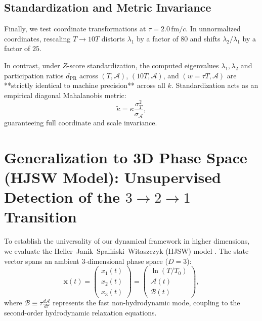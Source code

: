 \documentclass[11pt,a4paper]{article}
\begin{document}
\subsection{Standardization and Metric Invariance}
Finally, we test coordinate transformations at $\tau = 2.0\,\mathrm{fm}/c$. In unnormalized coordinates, rescaling $T \to 10T$ distorts $\lambda_1$ by a factor of $80$ and shifts $\lambda_2/\lambda_1$ by a factor of $25$.

In contrast, under $Z$-score standardization, the computed eigenvalues $\lambda_1, \lambda_2$ and participation ratios $d_{\mathrm{PR}}$ across $(T, \mathcal{A})$, $(10T, \mathcal{A})$, and $(w = \tau T, \mathcal{A})$ are **strictly identical to machine precision** across all $k$. Standardization acts as an empirical diagonal Mahalanobis metric:
\begin{equation}
    \tilde{\kappa} = \kappa \frac{\sigma_T^2}{\sigma_{\mathcal{A}}},
\end{equation}
guaranteeing full coordinate and scale invariance.

\section{Generalization to 3D Phase Space (HJSW Model): Unsupervised Detection of the \texorpdfstring{$3 \to 2 \to 1$}{3 -> 2 -> 1} Transition}
\label{sec:hjsw_generalization}
To establish the universality of our dynamical framework in higher dimensions, we evaluate the Heller--Janik--Spali\'nski--Witaszczyk (HJSW) model \cite{Heller2014}. The state vector spans an ambient 3-dimensional phase space ($D=3$):
\begin{equation}
    \mathbf{x}(t) = \begin{pmatrix} x_1(t) \\ x_2(t) \\ x_3(t) \end{pmatrix} = \begin{pmatrix} \ln(T/T_0) \\ \mathcal{A}(t) \\ \mathcal{B}(t) \end{pmatrix},
\end{equation}
where $\mathcal{B} \equiv \tau \frac{d\mathcal{A}}{d\tau}$ represents the fast non-hydrodynamic mode, coupling to the second-order hydrodynamic relaxation equations.
\end{document}
